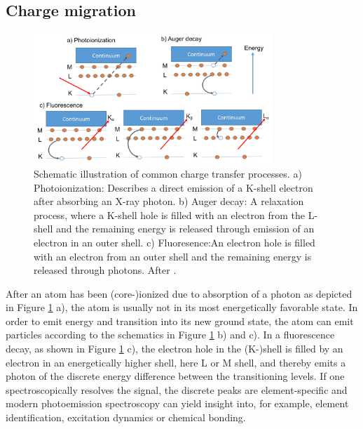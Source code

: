 \subsection{Charge migration}\label{sec:relaxation}
\begin{figure}
	\centering
		\includegraphics[width=0.80\textwidth]{images/el-relaxation.png}
	\caption[Schematic illustration of common charge transfer processes]{Schematic illustration of common charge transfer processes. a) Photoionization: Describes a direct emission of a K-shell electron after absorbing an X-ray photon. b) Auger decay: A relaxation process, where a K-shell hole is filled with an electron from the L-shell and the remaining energy is released through emission of an electron in an outer shell. c) Fluoresence:An electron hole is filled with an electron from an outer shell and the remaining energy is released through photons. After \citep[][p.~19]{Als-Nielson-2011-JWS}.}
	\label{fig:el-relaxation}
\end{figure}
After an atom has been (core-)ionized due to absorption of a photon as depicted in Figure \ref{fig:el-relaxation} a), the atom is usually not in its most energetically favorable state. In order to emit energy and transition into its new ground state, the atom can emit particles according to the schematics in Figure \ref{fig:el-relaxation} b) and c). In a fluorescence decay, as shown in Figure \ref{fig:el-relaxation} c), the electron hole in the (K-)shell is filled by an electron in an energetically higher shell, here L or M shell, and thereby emits a photon of the discrete energy difference between the transitioning levels. If one spectroscopically resolves the signal, the discrete peaks are element-specific and modern photoemission spectroscopy can yield insight into, for example, element identification, excitation dynamics or chemical bonding.
